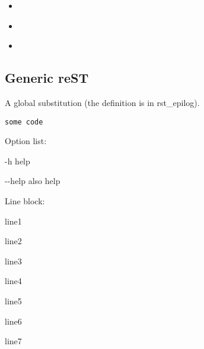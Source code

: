 \documentclass[letterpaper,10pt,english]{sphinxhowto}
\begin{document}
\begin{SphinxShadowBox}
\begin{itemize}
\begin{itemize}
\item {} 
\label{markup:id22}{\hyperref[markup:o\string-some\string-strange\string-characters]{}}

\item {} 
\label{markup:id23}{\hyperref[markup:only\string-directive]{}}

\item {} 
\label{markup:id24}{\hyperref[markup:any\string-role]{}}

\end{itemize}

\end{itemize}
\end{SphinxShadowBox}


\subsection{Generic reST}
\label{markup:generic-rest}
A global substitution (the definition is in rst\_epilog).
\label{markup:label}
\def\SphinxLiteralBlockLabel{\label{markup:label}}
\begin{Verbatim}[commandchars=\\\{\}]
some code
\end{Verbatim}
\let\SphinxLiteralBlockLabel\empty

Option list:
\begin{optionlist}{3cm}
\item [-h]  
help
\item [-{-}help]  
also help
\end{optionlist}

Line block:

\begin{DUlineblock}{0em}
\item[] line1
\item[]
\begin{DUlineblock}{\DUlineblockindent}
\item[] line2
\item[]
\begin{DUlineblock}{\DUlineblockindent}
\item[] line3
\item[]
\begin{DUlineblock}{\DUlineblockindent}
\item[] line4
\end{DUlineblock}
\end{DUlineblock}
\item[] line5
\end{DUlineblock}
\item[] line6
\item[]
\begin{DUlineblock}{\DUlineblockindent}
\item[] line7
\end{DUlineblock}
\end{DUlineblock}
\end{document}
